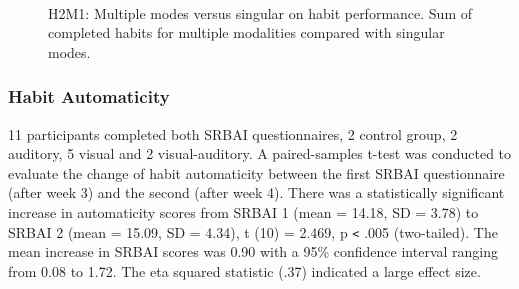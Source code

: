\begin{figure}[H]
\centering

  \caption{H2M1: Multiple modes versus singular on habit performance. Sum of completed habits for multiple modalities compared with singular modes.}~\label{fig:m1_h2}
\end{figure}


\subsubsection*{Habit Automaticity}
11 participants completed both SRBAI questionnaires, 2 control group, 2 auditory, 5 visual and 2 visual-auditory. A paired-samples t-test was conducted to evaluate the change of habit automaticity between the first SRBAI questionnaire (after week 3) and the second (after week 4). There was a statistically significant increase in automaticity scores from SRBAI 1 (mean = 14.18, SD = 3.78) to SRBAI 2 (mean = 15.09, SD = 4.34), t (10) = 2.469, p \verb|<| .005 (two-tailed). The mean increase in SRBAI scores was 0.90 with a 95\% confidence interval ranging from 0.08 to 1.72. The eta squared statistic (.37) indicated a large effect size.


